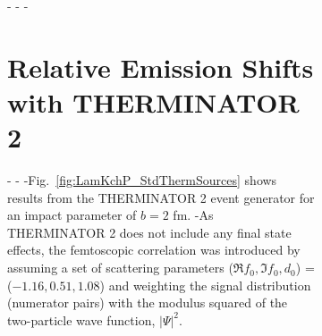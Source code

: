 \begin{figure}[h]
{\begin{table}[htbp]
\begin{figure}[h!]
{\begin{comment}
 
 \begin{figure}[h!]
   \centering
-  \texttt{[image: \\ResultsDirBase Results\_cLamcKch\_20181205/SphericalHarmonics/LamKchP/CanCfYlmReC00C11\_LamKchPALamKchM\_0010.pdf]}
-  \caption[\LamKchP $C_{00}$ and $\Re C_{11}$ Spherical Harmonic Components (0--10\%)]{$C_{00}$ (left) and $\Re C_{11}$ (right) components of a spherical harmonic decomposition of the \LamKchP correlation function for the 0--10\% centrality bin.  
-The $C_{00}$ component is similar to the 1D correlation functions typically studied, and probes the overall size of the source.
-The $\Re C_{11}$ component probes the asymmetry in the system; a non-zero value reveals the asymmetry}
-  \label{fig:LamKchP_ReC00C11_0010}
+  \texttt{[image: /home/jesse/Analysis/FemtoAnalysis/AnalysisNotes/7\_ResultsAndDiscussion/7.1\_ResultsLamK/7.1.2\_ResultsLamK\_DiscussionOfmTScaling/ThermPlots/LamKchP/CanCfwSourceAndDeltaTwC11wData\_Full\_LamKchP\_3dHistPairSource3d\_oslLamKchP\_FromFileCorrelationFunctions\_BuildCfYlm.pdf]}
+  \caption[THERMINATOR 2 simulatin for \LamKchP]
+  {
+  Results from the THERMINATOR 2 simulation implemented with an impact parameter $b = 2$ fm for the \LamKchP pair system.
+  (Top left) the one-dimensional correlation function from THERMINATOR 2 together with the experimental data.
+  (Top right) the $\Re C_{11}$ component of a spherical harmonic decomposition of the THERMINATOR 2 simulation together with the experimental data.
+  The other four panels show the source distribution from the simulation in the out (middle left), side (middle right), and long (bottom left) directions, as well as the temporal characteristics (bottom right), all in the PRF.
+  The source distributions have all been fitted with a Gaussian form, the results of which are printed within the respective plots.
+  }
+  \label{fig:LamKchP_StdThermSources}
 \end{figure}
-\end{comment}
-%
-
-\section{Relative Emission Shifts with THERMINATOR 2}
-\label{App:THERM}
-
-Fig.\ \ref{fig:LamKchP_StdThermSources} shows results from the THERMINATOR 2 event generator for an impact parameter of $b = 2$ fm.
-As THERMINATOR 2 does not include any final state effects, the femtoscopic correlation was introduced by assuming a set of scattering parameters ($\Re f_{0}, \Im f_{0}, d_{0}$) = ($-1.16, 0.51, 1.08$) and weighting the signal distribution (numerator pairs) with the modulus squared of the two-particle wave function, $|\Psi|^{2}$.
}
\end{figure}
\end{table}}
\end{figure}
